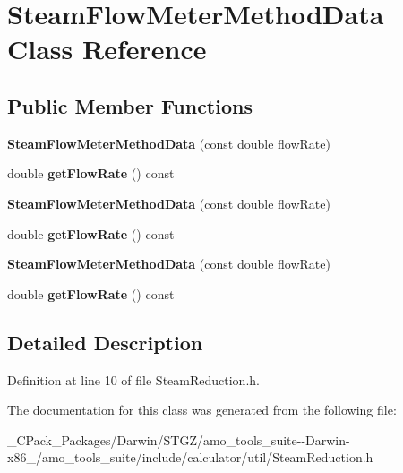 \hypertarget{class_steam_flow_meter_method_data}{}\section{Steam\+Flow\+Meter\+Method\+Data Class Reference}
\label{class_steam_flow_meter_method_data}
\subsection*{Public Member Functions}
\begin{DoxyCompactItemize}
\item 
\mbox{\label{class_steam_flow_meter_method_data_afa81e03f44095010d8e81874cc841612}} 
{\bfseries Steam\+Flow\+Meter\+Method\+Data} (const double flow\+Rate)
\item 
\mbox{\label{class_steam_flow_meter_method_data_a9c4739723d8d7dbd7fa22fc63e1d28de}} 
double {\bfseries get\+Flow\+Rate} () const
\item 
\mbox{\label{class_steam_flow_meter_method_data_afa81e03f44095010d8e81874cc841612}} 
{\bfseries Steam\+Flow\+Meter\+Method\+Data} (const double flow\+Rate)
\item 
\mbox{\label{class_steam_flow_meter_method_data_a9c4739723d8d7dbd7fa22fc63e1d28de}} 
double {\bfseries get\+Flow\+Rate} () const
\item 
\mbox{\label{class_steam_flow_meter_method_data_afa81e03f44095010d8e81874cc841612}} 
{\bfseries Steam\+Flow\+Meter\+Method\+Data} (const double flow\+Rate)
\item 
\mbox{\label{class_steam_flow_meter_method_data_a9c4739723d8d7dbd7fa22fc63e1d28de}} 
double {\bfseries get\+Flow\+Rate} () const
\end{DoxyCompactItemize}


\subsection{Detailed Description}


Definition at line 10 of file Steam\+Reduction.\+h.



The documentation for this class was generated from the following file\+:\begin{DoxyCompactItemize}
\item 
\+\_\+\+C\+Pack\+\_\+\+Packages/\+Darwin/\+S\+T\+G\+Z/amo\+\_\+tools\+\_\+suite-\/-\/\+Darwin-\/x86\+\_/amo\+\_\+tools\+\_\+suite/include/calculator/util/Steam\+Reduction.\+h\end{DoxyCompactItemize}
